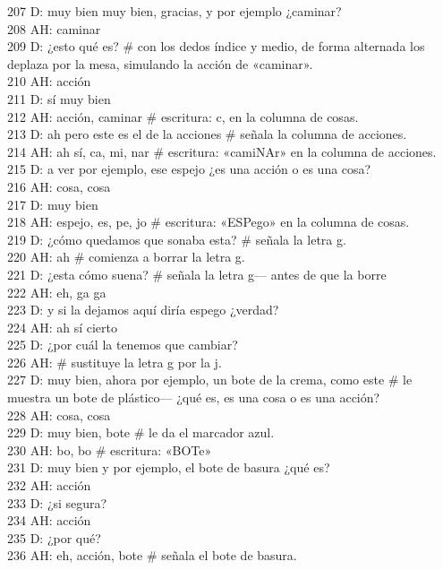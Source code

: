 207 D: muy bien muy bien, gracias, y por ejemplo ¿caminar?\\
208 AH: caminar\\
209 D: ¿esto qué es? \# con los dedos índice y medio, de forma alternada los deplaza por la mesa, simulando la acción de «caminar».\\
210 AH: acción\\
211 D: sí muy bien\\
212 AH: acción, caminar \# escritura: c, en la columna de cosas.\\
213 D: ah pero este es el de la acciones \# señala la columna de acciones.\\
214 AH: ah sí, ca, mi, nar \# escritura: «camiNAr» en la columna de acciones.\\
215 D: a ver por ejemplo, ese espejo ¿es una acción o es una cosa?\\
216 AH: cosa, cosa\\
217 D: muy bien\\
218 AH: espejo, es, pe, jo \# escritura: «ESPego» en la columna de cosas.\\
219 D: ¿cómo quedamos que sonaba esta? \# señala la letra g.\\
220 AH: ah \# comienza a borrar la letra g.\\
221 D: ¿esta cómo suena? \# señala la letra g--- antes de que la borre\\
222 AH: eh, ga ga\\
223 D: y si la dejamos aquí diría espego ¿verdad?\\
224 AH: ah sí cierto\\
225 D: ¿por cuál la tenemos que cambiar?\\
226 AH: \# sustituye la letra g por la j.\\
227 D: muy bien, ahora por ejemplo, un bote de la crema, como este \# le muestra un bote de plástico--- ¿qué es, es una cosa o es una acción?\\
228 AH: cosa, cosa\\
229 D: muy bien, bote \# le da el marcador azul.\\
230 AH: bo, bo \# escritura: «BOTe»\\
231 D: muy bien y por ejemplo, el bote de basura ¿qué es?\\
232 AH: acción\\
233 D: ¿si segura?\\
234 AH: acción\\
235 D: ¿por qué?\\
236 AH: eh, acción, bote \# señala el bote de basura.\\
